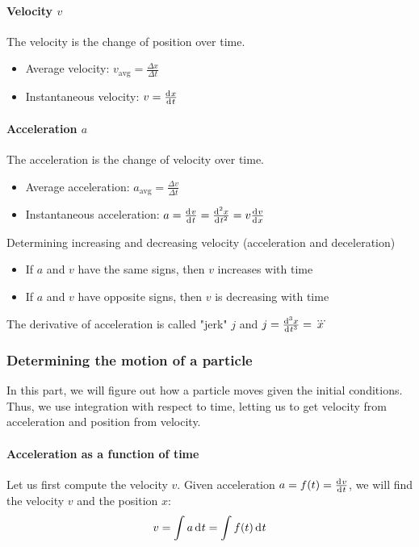 \documentclass[10pt, twocolumn]{article}
\begin{document}
\paragraph{Velocity \(v\)}
The velocity is the change of position over time.
\begin{itemize}
  \item Average velocity: \(v_\mathrm{avg} = \frac{\Delta x}{\Delta t}\)
  \item Instantaneous velocity: \(v = \frac{\mathrm{d}^{} x}{\mathrm{d}^{} t}\)
\end{itemize}

\paragraph{Acceleration \(a\)}
The acceleration is the change of velocity over time.
\begin{itemize}
  \item Average acceleration: \(a_\mathrm{avg} = \frac{\Delta v}{\Delta t}\)
  \item Instantaneous acceleration: \(a = \frac{\mathrm{d}^{} v}{\mathrm{d}^{} t} = \frac{\mathrm{d}^{2} x}{\mathrm{d}^{} t^{2}} = v \frac{\mathrm{d}^{} v}{\mathrm{d}^{} x}\)
\end{itemize}

Determining increasing and decreasing velocity (acceleration and deceleration)
\begin{itemize}
  \item If \(a\) and \(v\) have the same signs, then \(v\) increases with time
  \item If \(a\) and \(v\) have opposite signs, then \(v\) is decreasing with time
\end{itemize}

\begin{remark}
  The derivative of acceleration is called "jerk" \(j\) and \(j = \frac{\mathrm{d}^{3} x}{\mathrm{d}^{} t^{3}} = \dddot{x}\)
\end{remark}


\subsubsection{Determining the motion of a particle}
In this part, we will figure out how a particle moves given the initial conditions.
Thus, we use integration with respect to time, letting us to get velocity from acceleration and position from velocity.

\paragraph{Acceleration as a function of time}
Let us first compute the velocity \(v\).
Given acceleration \(a = f(t) = \frac{\mathrm{d}^{} v}{\mathrm{d}^{} t}\), we will find the velocity \(v\) and the position \(x\):
\[
  v = \int{a \,\mathrm{d}^{} t} = \int{f(t) \,\mathrm{d}^{} t}
\]
\end{document}
